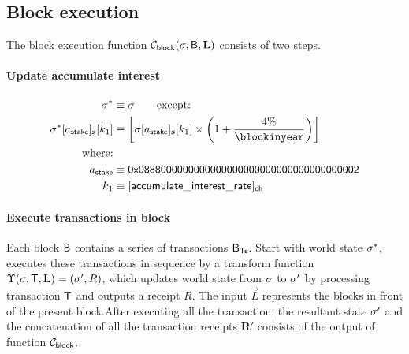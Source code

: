 \subsection{Block execution}\label{sec:block_exec}
The block execution function $\mathcal{C}_{\sf block}(\mathbf{\sigma},\textsf{B},\mathbf{L})$ consists of two steps. 

\paragraph{Update accumulate interest}
\begin{align}
	\st^{*}&\eqdef \st \qquad \mbox{except:} \\ 
	\st^{*}[a_{\sf stake}]_{\bf s}[k_1] & \eqdef \left\lfloor\st[a_{\sf stake}]_{\bf s}[k_1] \times \left(1+\frac{4\%}{\blockinyear}\right)\right\rfloor\\
	\mbox{where:}& \\ 
	a_{\sf stake} & \eqdef \stakingcontract \\ 
	k_1 & \eqdef [{\sf accumulate\char`_interest\char`_rate}]_{\sf ch}
\end{align}

\paragraph{Execute transactions in block}

Each block $\textsf{B}$ contains a series of transactions $\textsf{B}_{\sf Ts}$. Start with world state $\mathbf{\sigma}^{*}$, \name executes these transactions in sequence by a transform function $\Upsilon(\mathbf{\sigma},\textsf{T},\mathbf{L})=(\mathbf{\sigma}',R)$, which updates world state from $\mathbf{\sigma}$ to $\mathbf{\sigma}'$ by processing transaction $\textsf{T}$ and outputs a receipt $R$. The input $\vec{L}$ represents the blocks in front of the present block.After executing all the transaction, the resultant state $\mathbf{\sigma}'$ and the concatenation of all the transaction receipts $\mathbf{R}'$ consists of the output of function $\mathcal{C}_{\sf block}$.
